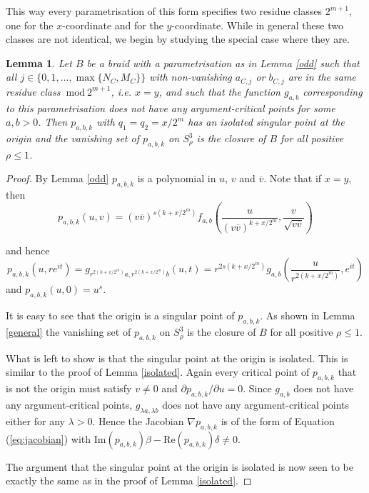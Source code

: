 \documentclass[notitlepage,12pt]{revtex4-1}
\newtheorem{lemma}[theorem]{\bf Lemma}
\begin{document}
This way every parametrisation of this form specifies two residue classes $2^{m+1}$, one for the $x$-coordinate and for the $y$-coordinate. While in general these two classes are not identical, we begin by studying the special case where they are.

\begin{lemma}
\label{same}
Let $B$ be a braid with a parametrisation as in Lemma \ref{odd} such that all $j\in\{0,1,\ldots,\max\{N_{C},M_{C}\}\}$ with non-vanishing $a_{C,j}$ or $b_{C,j}$ are in the same residue class $\ \mathrm{mod}\  2^{m+1}$, i.e. $x=y$, and such that the function $g_{a,b}$ corresponding to this parametrisation does not have any argument-critical points for some $a,b>0$. Then $p_{a,b,k}$ with $q_{1}=q_{2}=x/2^m$ has an isolated singular point at the origin and the vanishing set of $p_{a,b,k}$ on $S^{3}_{\rho}$ is the closure of $B$ for all positive $\rho\leq 1$.
\end{lemma}

\begin{proof}
By Lemma \ref{odd} $p_{a,b,k}$ is a polynomial in $u$, $v$ and $\overline{v}$. Note that if $x=y$, then
\begin{equation}
p_{a,b,k}(u,v)=(v\overline{v})^{s(k+x/2^{m})}f_{a,b}\left(\frac{u}{(v\overline{v})^{k+x/2^{m}}},\frac{v}{\sqrt{v\overline{v}}}\right)
\end{equation} 

and hence
\begin{equation}
\label{eq:unit}
p_{a,b,k}(u,re^{it})=g_{r^{2(k+x/2^{m})}a,r^{2(k+x/2^{m})}b}(u,t)=r^{2s(k+x/2^{m})}g_{a,b}\left(\frac{u}{r^{2(k+x/2^{m})}},e^{it}\right)
\end{equation}
and $p_{a,b,k}(u,0)=u^{s}$.

It is easy to see that the origin is a singular point of $p_{a,b,k}$. 
As shown in Lemma \ref{general} the vanishing set of $p_{a,b,k}$ on $S^{3}_{\rho}$ is the closure of $B$ for all positive $\rho\leq1$.

What is left to show is that the singular point at the origin is isolated. This is similar to the proof of Lemma \ref{isolated}. Again every critical point of $p_{a,b,k}$ that is not the origin must satisfy $v\neq0$ and $\partial p_{a,b,k}/\partial u=0$. Since $g_{a,b}$ does not have any argument-critical points, $g_{\lambda a,\lambda b}$ does not have any argument-critical points either for any $\lambda>0$. Hence the Jacobian $\nabla p_{a,b,k}$ is of the form of Equation (\ref{eq:jacobian}) with $\mathrm{Im}(p_{a,b,k})\beta-\mathrm{Re}(p_{a,b,k})\delta\neq0$.

The argument that the singular point at the origin is isolated is now seen to be exactly the same as in the proof of Lemma \ref{isolated}. 

\end{proof}
\end{document}

